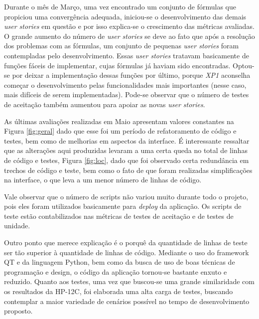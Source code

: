 Durante o mês de Março, uma vez encontrado um conjunto de fórmulas que propiciou uma convergência adequada, 
iniciou-se o desenvolvimento das demais \textit{user stories} em questão e por isso explica-se o crescimento
 das métricas avaliadas. O grande aumento do número de \textit{user stories} se deve ao fato que após a
resolução dos problemas com as fórmulas, um conjunto de pequenas \textit{user stories} foram contempladas pelo
desenvolvimento. Essas \textit{user stories} tratavam basicamente de funções fáceis de implementar, cujas
fórmulas já haviam sido encontradas. Optou-se por deixar a implementação dessas funções por último, porque \textit{XP1}
aconselha começar o desenvolvimento pelas funcionalidades mais importantes (nesse caso, mais difíceis de serem 
implementadas). Pode-se observar que o número de testes de aceitação também aumentou para apoiar as 
novas \textit{user stories}.

As últimas avaliações realizadas em Maio apresentam valores constantes na Figura 
\ref{fig:geral} dado que esse foi um período de refatoramento de código e testes, bem como de melhorias em 
aspectos da interface. É interessante ressaltar que as alterações aqui produzidas levaram a uma certa queda 
no total de linhas de código e testes, Figura \ref{fig:loc}, dado que foi observado certa redundância em trechos 
de código e teste, bem como o fato de que foram realizadas simplificações na interface, o que leva a um menor 
número de linhas de código.

Vale observar que o número de scripts não variou muito durante todo o projeto, pois
eles foram utilizados basicamente para \textit{deploy} da aplicação. Os scripts de teste estão contabilizados
nas métricas de testes de aceitação e de testes de unidade.

Outro ponto que merece explicação é o porquê da quantidade de linhas de teste ser tão superior à quantidade 
de linhas de código. Mediante o uso do framework QT e da linguagem Python, bem como da busca de uso de boas 
técnicas de programação e design, o código da aplicação tornou-se bastante enxuto e reduzido. Quanto aos 
testes, uma vez que buscou-se uma grande similaridade com os resultados da HP-12C, foi elaborada uma alta 
carga de testes, buscando contemplar a maior variedade de cenários possível no tempo de desenvolvimento proposto.